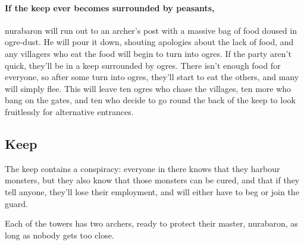 \begin{multicols}{2}
\paragraph{If the keep ever becomes surrounded by peasants,}
\gls{nurabaron} will run out to an archer's post with a massive bag of food doused in ogre-dust.
He will pour it down, shouting apologies about the lack of food, and any villagers who eat the food will begin to turn into ogres.
If the party aren't quick, they'll be in a keep surrounded by ogres.
There isn't enough food for everyone, so after some turn into ogres, they'll start to eat the others, and many will simply flee.
This will leave ten ogres who chase the villages, ten more who bang on the gates, and ten who decide to go round the back of the keep to look fruitlessly for alternative entrances.

\subsection*{ Keep}


\setcounter{list}{0}

The keep contains a conspiracy: everyone in there knows that they harbour monsters, but they also know that those monsters can be cured, and that if they tell anyone, they'll lose their employment, and will either have to beg or join the \gls{guard}.


Each of the towers has two archers, ready to protect their master, \gls{nurabaron}, as long as nobody gets too close.


\begin{figure*}[t!]

\begin{multicols}{2}



\end{multicols}

\end{figure*}

\begin{figure*}[b!]
\begin{multicols}{2}


\end{multicols}
\end{figure*}
\end{multicols}
